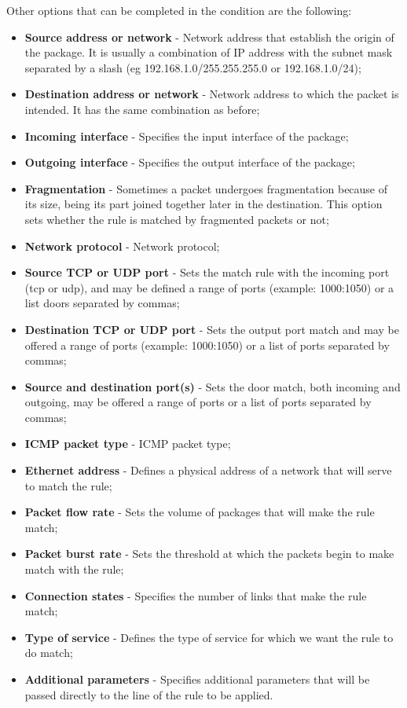 Other options that can be completed in the condition are the following:
\begin{itemize}
    \item \textbf{Source address or network} - Network address that establish the origin of the package. It is usually a combination of IP address with the subnet mask separated by a slash (eg 192.168.1.0/255.255.255.0 or 192.168.1.0/24);
    \item \textbf{Destination address or network} - Network address to which the packet is intended. It has the same combination as before;
    \item \textbf{Incoming interface} - Specifies the input interface of the package;
    \item \textbf{Outgoing interface} - Specifies the output interface of the package;
    \item \textbf{Fragmentation} - Sometimes a packet undergoes fragmentation because of its size, being its part joined together later in the destination. This option sets whether the rule is matched by fragmented packets or not;
    \item \textbf{Network protocol} - Network protocol;
    \item \textbf{Source TCP or UDP port} - Sets the match rule with the incoming port (tcp or udp), and may be defined a range of ports (example: 1000:1050) or a list doors separated by commas;
    \item \textbf{Destination TCP or UDP port} - Sets the output port match and may be offered a range of ports (example: 1000:1050) or a list of ports separated by commas;
    \item \textbf{Source and destination port(s)} - Sets the door match, both incoming and outgoing, may be offered a range of ports or a list of ports separated by commas;
    \item \textbf{ICMP packet type} - ICMP packet type;
    \item \textbf{Ethernet address} - Defines a physical address of a network that will serve to match the rule;
    \item \textbf{Packet flow rate} - Sets the volume of packages that will make the rule match;
    \item \textbf{Packet burst rate} - Sets the threshold at which the packets begin to make match with the rule;
    \item \textbf{Connection states} - Specifies the number of links that make the rule match;
    \item \textbf{Type of service} - Defines the type of service for which we want the rule to do match;
    \item \textbf{Additional parameters} - Specifies additional parameters that will be passed directly to the line of the rule to be applied.
\end{itemize}

